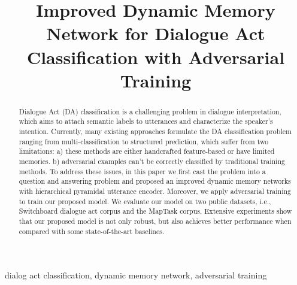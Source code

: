 \documentclass[conference]{IEEEtran}
\begin{document}
	\title{Improved Dynamic Memory Network for  Dialogue Act Classification with Adversarial Training}
	\author{
	}
	\maketitle
	
	\begin{abstract}
		Dialogue Act (DA) classification is a challenging problem in dialogue interpretation, which aims to attach semantic labels to utterances and characterize the speaker's intention.
		Currently, many existing approaches formulate the DA classification problem ranging from multi-classification to structured prediction, which suffer from two limitations: a) these methods are either handcrafted feature-based or have limited memories. b) adversarial examples can't be correctly classified by traditional training methods. To address these issues, in this paper we first cast the problem into a question and answering problem and proposed an improved dynamic memory networks with hierarchical pyramidal utterance encoder. Moreover, we apply adversarial training to train our proposed model. We evaluate our model on two public datasets, i.e., Switchboard dialogue act corpus and the MapTask corpus. Extensive experiments show that our proposed model is not only robust, but also achieves better performance when compared with some state-of-the-art baselines. 
	\end{abstract}
	
	\begin{IEEEkeywords}
		dialog act classification, dynamic memory network, adversarial training
	\end{IEEEkeywords}
	
\end{document}
